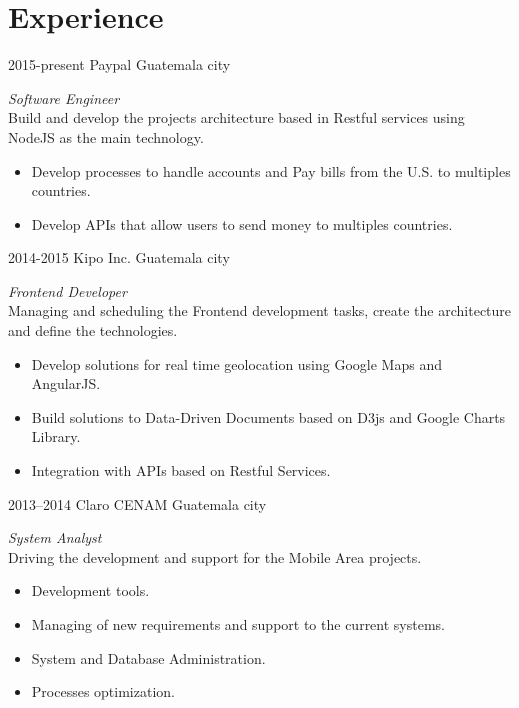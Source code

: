 \documentclass[]{friggeri-cv} %
\begin{document}
\section{Experience}
\begin{entrylist}
\entry
	{2015-present}
	{Paypal}
	{Guatemala city}
	{\emph{Software Engineer} \\
	Build and develop the projects architecture based in Restful services using NodeJS as the main technology.
	\begin{itemize}
		\item Develop processes to handle accounts and Pay bills from the U.S. to multiples countries.
		\item Develop APIs that allow users to send money to multiples countries.
	\end{itemize}
	}

\entry
	{2014-2015}
	{Kipo Inc.}
	{Guatemala city}
	{\emph{Frontend Developer} \\
	Managing and scheduling the Frontend development tasks, create the architecture and define the technologies.
	\begin{itemize}
		\item Develop solutions for real time geolocation using Google Maps and AngularJS.
		\item Build solutions to Data-Driven Documents based on D3js and Google Charts Library.
		\item Integration with APIs based on Restful Services.
	\end{itemize}
	
	}
	
\entry
	{2013--2014}
	{Claro CENAM}
	{Guatemala city}
	{\emph{System Analyst} \\
	Driving the development and support for the Mobile Area projects.
	\begin{itemize}
		\item Development tools.
		\item Managing of new requirements and support to the current systems.
		\item System and Database Administration.
		\item Processes optimization.
		
	\end{itemize}
	
	}

\end{entrylist}

\end{document}
